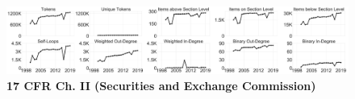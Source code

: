 \documentclass[varwidth, border=0pt]{standalone}
\begin{document}
 	
 	\begin{figure}
 		\centering
 			\caption*{\textbf{17 CFR Ch. II (Securities and Exchange Commission)}}
 			\includegraphics[width=\linewidth]{../../graphics/evolution/us-17cfrII.pdf}%
 	\end{figure}
 	
 
\end{document}
